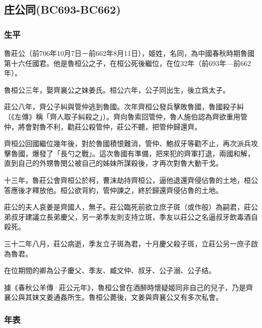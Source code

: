 
\subsection{庄公同{\tiny(BC693-BC662)}}

\subsubsection{生平}

魯莊公（前706年10月7日－前662年8月11日），姬姓，名同，為中國春秋時期魯國第十六任國君。他是魯桓公之子，在桓公死後繼位，在位32年（前693年—前662年）。

魯桓公三年，娶齊襄公之妹姜氏。桓公六年，公子同出生，後立爲太子。

莊公八年，齊公子糾與管仲逃到魯國。次年齊桓公發兵擊敗魯國，魯國殺子糾（《左傳》稱「齊人取子糾殺之」）。齊向魯索回管仲，魯人施伯認為齊欲重用管仲，將會對魯不利，勸莊公殺管仲，莊公不聽，把管仲歸還齊。

齊桓公回國繼位幾年後，對於魯國積恨難消，管仲、鮑叔牙等勸不止，再次派兵攻擊魯國，爆發了「長勺之戰」。這次魯國有準備，把來犯的齊軍打退，兩國和解，直到自己的外甥魯閔公被自己的姊妹所謀殺後，才再次對魯大動干戈。

十三年，魯莊公會齊桓公於柯，曹沫劫持齊桓公，逼他退還齊侵佔魯的土地，桓公答應後才釋放他。桓公欲背約，管仲諫之，終於歸還齊侵佔魯的土地。

莊公的夫人哀姜是齊國人，無子。莊公臨死前欲立庶子斑（或作般）為嗣君，莊公弟叔牙建議立長弟慶父，另一弟季友則支持立斑，季友以莊公之名逼叔牙飲毒酒自殺死。

三十二年八月，莊公病逝，季友立子斑為君，十月慶父殺子斑，立莊公另一庶子啟為魯君。

在位期間的卿為公子慶父、季友、臧文仲、叔牙、公子溺、公子结。

據《春秋公羊傳·莊公元年》，魯桓公曾在酒醉時懷疑姬同非自己的兒子，乃是齊襄公與其妹文姜通姦所生。魯桓公薨後，文姜與齊襄公又有多次私會。

\subsubsection{年表}

